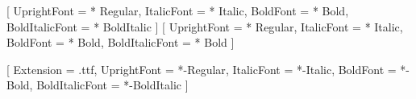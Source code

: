 \sffamily
\renewcommand{\familydefault}{\sfdefault}

\usepackage{dsfont}  %
\usepackage{fontawesome5}
\usepackage{mfirstuc}
\usepackage{ulem}

\usepackage{unicode-math}

\ifluatex



    

    \setmainfont[
        Scale=MatchLowercase
    ]{Noto Serif}[
        UprightFont = {* Regular}, 
        ItalicFont = {* Italic}, 
        BoldFont = {* Bold}, 
        BoldItalicFont = {* BoldItalic} 
    ]
    \setsansfont[
        Scale=MatchLowercase
    ]{Noto Sans}[
        UprightFont = {* Regular}, 
        ItalicFont = {* Italic}, 
        BoldFont = {* Bold}, 
        BoldItalicFont = {* Bold} 
    ]

    \setmonofont[
        Scale=MatchLowercase
    ]{JetBrainsMonoNerdFont}[
        Extension = {.ttf},
        UprightFont = {*-Regular}, 
        ItalicFont = {*-Italic}, 
        BoldFont = {*-Bold}, 
        BoldItalicFont = {*-BoldItalic} 
    ]




\else
    \usepackage{avant}
\fi